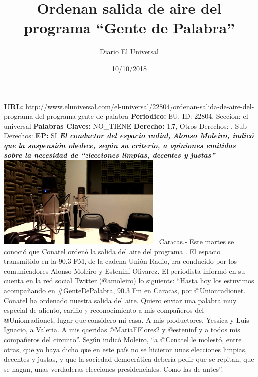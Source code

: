 \documentclass{article}%
\title{\textbf{Ordenan salida de aire del programa “Gente de Palabra”}}%
\author{Diario El Universal}%
\date{10/10/2018}%
\begin{document}
%
\normalsize%
\maketitle%
\textbf{URL: }%
http://www.eluniversal.com/el{-}universal/22804/ordenan{-}salida{-}de{-}aire{-}del{-}programa{-}del{-}programa{-}gente{-}de{-}palabra\newline%
%
\textbf{Periodico: }%
EU, %
ID: %
22804, %
Seccion: %
el{-}universal\newline%
%
\textbf{Palabras Claves: }%
NO\_TIENE\newline%
%
\textbf{Derecho: }%
1.7, %
Otros Derechos: %
, %
Sub Derechos: %
\newline%
%
\textbf{EP: }%
SI\newline%
\newline%
%
\textbf{\textit{El conductor del espacio radial, Alonso Moleiro, indicó que la suspensión obedece, según su criterio, a opiniones emitidas sobre la necesidad de “elecciones limpias, decentes y justas”}}%
\newline%
\newline%
%
\includegraphics[width=300px]{106.jpg}%
\newline%
%
~Caracas.{-} Este martes se conoció que Conatel ordenó la salida del aire del programa%
\newline%
%
. El espacio transmitido en la 90.3 FM, de la cadena Unión Radio, era conducido por los  comunicadores Alonso Moleiro y Esteninf Olivarez.%
\newline%
%
El periodista informó en su cuenta en la red social Twitter (@amoleiro)  lo siguiente: “Hasta hoy los estuvimos acompañando en \#GenteDePalabra, 90.3 Fm en Caracas, por @Unionradionet. Conatel ha ordenado nuestra salida del aire. Quiero enviar una palabra muy especial de aliento, cariño y reconocimiento a mis compañeros del @Unionradionet, lugar que considero mi casa. A mis productores, Yessica y Luis Ignacio, a Valeria. A mis queridas @MariaFFlores2 y @esteninf y a todos mis compañeros del circuito”.%
\newline%
%
Según indicó Moleiro, “a @Conatel le molestó, entre otras, que yo haya dicho que en este país no se hicieron unas elecciones limpias, decentes y justas, y que la sociedad democrática debería pedir que se repitan, que se hagan, unas verdaderas elecciones presidenciales. Como las de antes”.%
\end{document}
